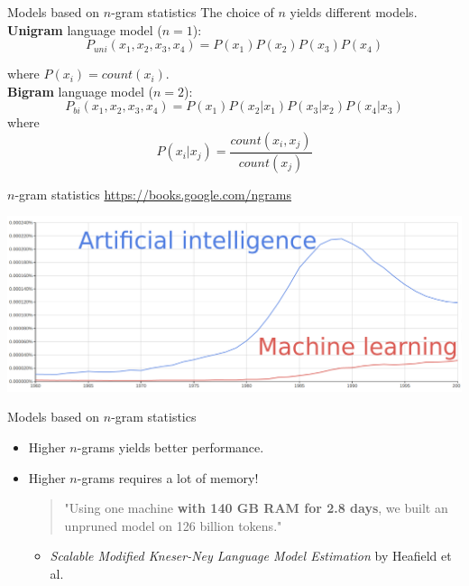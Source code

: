 \documentclass[10pt]{beamer}
\begin{document}
\begin{frame}{Models based on $n$-gram statistics}
The choice of $n$ yields different models.\\

\textbf{Unigram} language model ($n=1$): 
\begin{equation*}
P_{uni}(x_1, x_2, x_3, x_4) = P(x_1)P(x_2)P(x_3)P(x_4)
\end{equation*}

where $P(x_i) = count(x_i)$.\\

\textbf{Bigram} language model ($n=2$): 
\begin{equation*}
P_{bi}(x_1,x_2,x_3,x_4) = P(x_1)P(x_2\vert x_1)P(x_3\vert x_2)P(x_4\vert x_3)
\end{equation*} 
where
\[
P(x_i\vert x_j) = \frac{count(x_i, x_j)}{count(x_j)}
\]
\end{frame}

\begin{frame}{$n$-gram statistics}
\url{https://books.google.com/ngrams}
\vspace{0.4cm}

\includegraphics[scale=0.14]{images/AI_ML.png}
\end{frame}



\begin{frame}{Models based on $n$-gram statistics}
\begin{itemize}
\item Higher $n$-grams yields better performance.
\vspace{0.7cm}
\item Higher $n$-grams requires a lot of memory!
\vspace{0.1cm}
\begin{quote}
"Using one machine \textbf{with 140 GB
RAM for 2.8 days}, we built an unpruned
model on 126 billion tokens."
\end{quote}
\begin{itemize}
\item [] \textit{Scalable Modified Kneser-Ney Language Model Estimation} by Heafield et al.
\end{itemize}
\end{itemize}
\end{frame}
\end{document}
